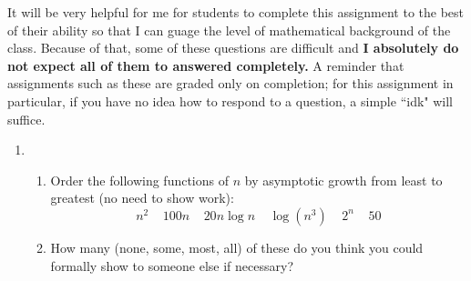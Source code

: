 \documentclass[12pt,letterpaper]{article}
\begin{document}
It will be very helpful for me for students to complete this assignment to the best of their ability so that I can guage the level of mathematical background of the class. Because of that, some of these questions are difficult and {\bf I absolutely do not expect all of them to answered completely.} A reminder that assignments such as these are graded only on completion; for this assignment in particular, if you have no idea how to respond to a question, a simple ``idk" will suffice. 

\begin{enumerate}
	\item \begin{enumerate}
		\item Order the following functions of $n$ by asymptotic growth from least to greatest (no need to show work):
		$$n^2\ \ \ \ \ 100n\ \ \ \ \ 20n\log n\ \ \ \ \ \log(n^3)\ \ \ \ \ 2^n\ \ \ \ \ 50$$
		\vspace{1 in}
		\item How many (none, some, most, all) of these do you think you could formally show to someone else if necessary? 
		\vspace{.3 in}
	\end{enumerate}
	

\end{enumerate}
\end{document}
